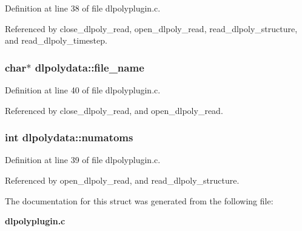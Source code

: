 Definition at line 38 of file dlpolyplugin.c.

Referenced by close\_\-dlpoly\_\-read, open\_\-dlpoly\_\-read, read\_\-dlpoly\_\-structure, and read\_\-dlpoly\_\-timestep.
\subsubsection{\setlength{\rightskip}{0pt plus 5cm}char$\ast$ dlpolydata::file\_\-name}\label{structdlpolydata_m2}




Definition at line 40 of file dlpolyplugin.c.

Referenced by close\_\-dlpoly\_\-read, and open\_\-dlpoly\_\-read.
\subsubsection{\setlength{\rightskip}{0pt plus 5cm}int dlpolydata::numatoms}\label{structdlpolydata_m1}




Definition at line 39 of file dlpolyplugin.c.

Referenced by open\_\-dlpoly\_\-read, and read\_\-dlpoly\_\-structure.

The documentation for this struct was generated from the following file:\begin{CompactItemize}
\item 
{\bf dlpolyplugin.c}\end{CompactItemize}

